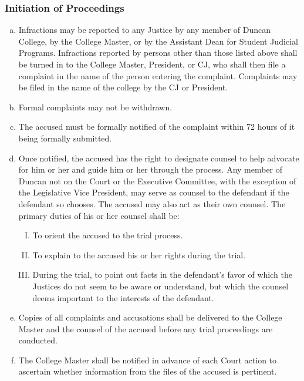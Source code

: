 \documentclass[USletter,12pt]{article}
\begin{document}
\subsubsection{Initiation of Proceedings}
\begin{enumerate}[(a)]
\item Infractions may be reported to any Justice by any member of Duncan College, by the College Master, or by the Assistant Dean for Student Judicial Programs. Infractions reported by persons other than those listed above shall be turned in to the College Master, President, or CJ, who shall then file a complaint in the name of the person entering the complaint.  Complaints may be filed in the name of the college by the CJ or President.
\item Formal complaints may not be withdrawn.
\item The accused must be formally notified of the complaint within 72 hours of it being formally submitted.
\item Once notified, the accused has the right to designate counsel to help advocate for him or her and guide him or her through the process.  Any member of Duncan not on the Court or the Executive Committee, with the exception of the Legislative Vice President, may serve as counsel to the defendant if the defendant so chooses.  The accused may also act as their own counsel.  The primary duties of his or her counsel shall be:
	\begin{enumerate}[(I)]
	\item To orient the accused to the trial process.
	\item To explain to the accused his or her rights during the trial.
	\item During the trial, to point out facts in the defendant's favor of which the Justices do not seem to be aware or understand, but which the counsel deems important to the interests of the defendant.
	\end{enumerate}
\item Copies of all complaints and accusations shall be delivered to the College Master and the counsel of the accused before any trial proceedings are conducted.
\item The College Master shall be notified in advance of each Court action to ascertain whether information from the files of the accused is pertinent.
\end{enumerate}
\end{document}
